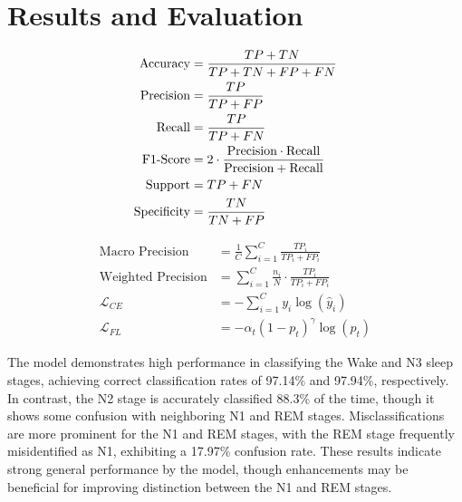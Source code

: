 \section{Results and Evaluation}

\begin{center}
	\begin{minipage}[t]{0.48\textwidth}
		\begin{align}
			\text{Accuracy} &= \frac{TP + TN}{TP + TN + FP + FN} \\
			\text{Precision} &= \frac{TP}{TP + FP} \\
			\text{Recall} &= \frac{TP}{TP + FN} \\
			\text{F1\text{-}Score} &= 2 \cdot \frac{\text{Precision} \cdot \text{Recall}}{\text{Precision} + \text{Recall}} \\
			\text{Support} &= TP + FN \\
			\text{Specificity} &= \frac{TN}{TN + FP}
		\end{align}
	\end{minipage}
	\hfill	
	\begin{minipage}[t]{0.48\textwidth}
		\begin{align}
			\text{Macro Precision} &= \frac{1}{C} \sum_{i=1}^{C} \frac{TP_i}{TP_i + FP_i} \\
			\text{Weighted Precision} &= \sum_{i=1}^{C} \frac{n_i}{N} \cdot \frac{TP_i}{TP_i + FP_i} \\
			\mathcal{L}_{CE} &= -\sum_{i=1}^{C} y_i \log(\hat{y}_i) \\
			\mathcal{L}_{FL} &= -\alpha_t (1 - p_t)^\gamma \log(p_t)
		\end{align}
	\end{minipage}
\end{center}

The model demonstrates high performance in classifying the Wake and N3 sleep stages, achieving correct classification rates of 97.14\% and 97.94\%, respectively. In contrast, the N2 stage is accurately classified 88.3\% of the time, though it shows some confusion with neighboring N1 and REM stages. Misclassifications are more prominent for the N1 and REM stages, with the REM stage frequently misidentified as N1, exhibiting a 17.97\% confusion rate. These results indicate strong general performance by the model, though enhancements may be beneficial for improving distinction between the N1 and REM stages.

